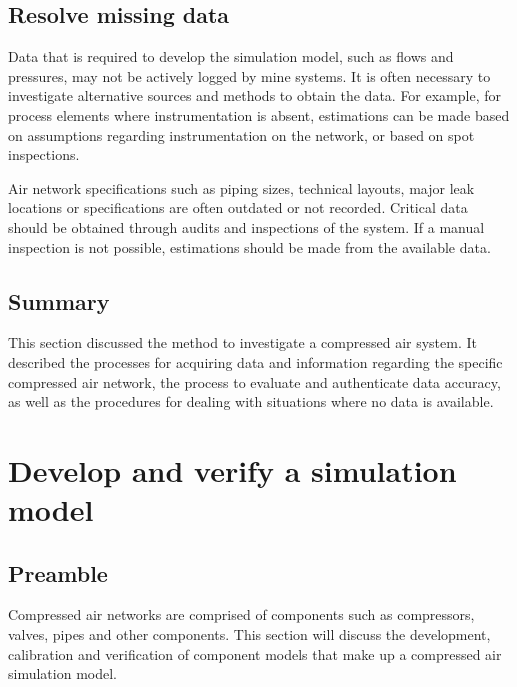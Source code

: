 	\subsection{Resolve missing data}
		Data that is required to develop the simulation model, such as flows and pressures, may not be actively logged by mine systems. It is often necessary to investigate alternative sources and methods to obtain the data. For example, for process elements where instrumentation is absent, estimations can be made based on assumptions regarding instrumentation on the network, or based on spot inspections.
		\par 
		Air network specifications such as piping sizes, technical layouts, major leak locations or specifications are often outdated or not recorded. Critical data should be obtained through audits and inspections of the system. If a manual inspection is not possible, estimations should be made from the available data. %
	
	\subsection{Summary}	
	This section discussed the method to investigate a compressed air system. It described the processes for acquiring data and information regarding the specific compressed air network, the process to evaluate and authenticate data accuracy, as well as the procedures for dealing with situations where no data is available.
\section{Develop and verify a simulation model}
	\subsection{Preamble}
	Compressed air networks are comprised of components such as compressors, valves, pipes and other components. This section will discuss the development, calibration and verification of component models that make up a compressed air simulation model. 
	

